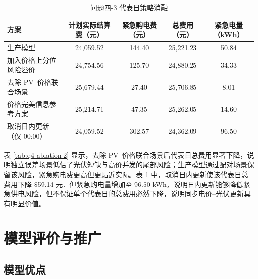 \documentclass[withoutpreface,bwprint]{cumcmthesis} %
\begin{document}
\begin{table}[H]
  \centering
  \caption{问题四-3 代表日策略消融}
  \label{tab:q4-ablation-3}
  \small
  \begin{tabularx}{\textwidth}{p{}cccc}
    \toprule
    方案 & 计划实际结算费（元） & 紧急购电费（元） & 总费用（元） & 紧急电量（kWh） \\
    \midrule
    生产模型 & 24,059.52 & 144.40 & 25,221.23 & 50.84 \\
    加入价格上分位风险溢价 & 24,754.56 & 125.70 & 24,880.25 & 34.33 \\
    去除 PV--价格联合场景 & 25,679.44 & 27.40 & 25,706.85 & 8.01 \\
    价格完美信息参考方案 & 25,214.71 & 47.35 & 25,262.05 & 14.60 \\
    取消日内更新（仅 00:00） & 24,059.52 & 302.57 & 24,362.09 & 96.50 \\
    \bottomrule
  \end{tabularx}
\end{table}

表 \ref{tab:q4-ablation-2} 显示，去除 PV--价格联合场景后代表日总费用显著下降，说明独立误差场景低估了光伏短缺与高价并发的尾部风险；生产模型通过配对场景保留该风险，紧急购电费更高但更贴近实际。表 \ref{tab:q4-ablation-3} 中，取消日内更新使该代表日总费用下降 859.14 元，但紧急购电量增加至 96.50 kWh，说明日内更新能够降低紧急供电风险，但不保证单个代表日的总费用必然下降，说明同步电价--光伏更新具有明显价值。

\section{模型评价与推广}

\subsection{模型优点}
\end{document}
